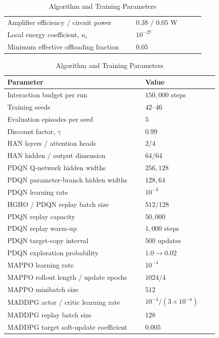 \documentclass[journal]{IEEEtran}
\makeatletter
\newcommand{\LEOTableSetup}{%
  \setlength{\parskip}{0pt}%
  \setlength{\belowcaptionskip}{5pt}%
  \def\@IEEEtablecaptionsepspace{\vskip5pt\relax}%
}
\makeatother
\begin{document}
\begin{table}[t]
\begin{minipage}[t]{0.485\textwidth}
\begin{tabular}{p{0.60\linewidth}p{0.32\linewidth}}
        Amplifier efficiency / circuit power & $0.38$ / $0.05$ W \\
        Local energy coefficient, $\kappa_i$ & $10^{-27}$ \\
        Minimum effective offloading fraction & $0.05$ \\
        \hline
    \end{tabular}
\end{minipage}\hfill%
\begin{minipage}[t]{0.485\textwidth}
\vspace{0pt}
\LEOTableSetup
\caption{Algorithm and Training Parameters}
    \label{tab:training_parameters}
    \centering
    \footnotesize
    \renewcommand{\arraystretch}{1.08}
    \setlength{\tabcolsep}{4pt}
    \begin{tabular}{p{0.60\linewidth}p{0.32\linewidth}}
        \hline
        Parameter & Value \\
        \hline
        Interaction budget per run & $150{,}000$ steps \\
        Training seeds & $42$--$46$ \\
        Evaluation episodes per seed & $5$ \\
        Discount factor, $\gamma$ & $0.99$ \\
        HAN layers / attention heads & $2/4$ \\
        HAN hidden / output dimension & $64/64$ \\
        PDQN Q-network hidden widths & $256,128$ \\
        PDQN parameter-branch hidden widths & $128,64$ \\
        PDQN learning rate & $10^{-3}$ \\
        HGHO / PDQN replay batch size & $512/128$ \\
        PDQN replay capacity & $50{,}000$ \\
        PDQN replay warm-up & $1{,}000$ steps \\
        PDQN target-copy interval & $500$ updates \\
        PDQN exploration probability & $1.0\rightarrow0.02$ \\
        MAPPO learning rate & $10^{-4}$ \\
        MAPPO rollout length / update epochs & $1024/4$ \\
        MAPPO minibatch size & $512$ \\
        MADDPG actor / critic learning rate
        & $10^{-4}/(3\times10^{-4})$ \\
        MADDPG replay batch size & $128$ \\
        MADDPG target soft-update coefficient & $0.005$ \\
        \hline
    \end{tabular}
\end{minipage}
\end{table}
\end{document}
